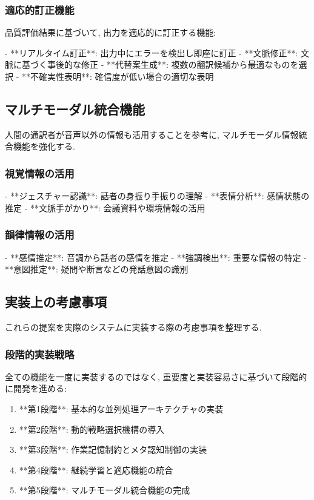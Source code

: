 \subsubsection{適応的訂正機能}

品質評価結果に基づいて, 出力を適応的に訂正する機能:

- **リアルタイム訂正**: 出力中にエラーを検出し即座に訂正
- **文脈修正**: 文脈に基づく事後的な修正
- **代替案生成**: 複数の翻訳候補から最適なものを選択
- **不確実性表明**: 確信度が低い場合の適切な表明

\subsection{マルチモーダル統合機能}

人間の通訳者が音声以外の情報も活用することを参考に, マルチモーダル情報統合機能を強化する.

\subsubsection{視覚情報の活用}

- **ジェスチャー認識**: 話者の身振り手振りの理解
- **表情分析**: 感情状態の推定
- **文脈手がかり**: 会議資料や環境情報の活用

\subsubsection{韻律情報の活用}

- **感情推定**: 音調から話者の感情を推定
- **強調検出**: 重要な情報の特定
- **意図推定**: 疑問や断言などの発話意図の識別

\subsection{実装上の考慮事項}

これらの提案を実際のシステムに実装する際の考慮事項を整理する.

\subsubsection{段階的実装戦略}

全ての機能を一度に実装するのではなく, 重要度と実装容易さに基づいて段階的に開発を進める:

\begin{enumerate}
\item **第1段階**: 基本的な並列処理アーキテクチャの実装
\item **第2段階**: 動的戦略選択機構の導入
\item **第3段階**: 作業記憶制約とメタ認知制御の実装
\item **第4段階**: 継続学習と適応機能の統合
\item **第5段階**: マルチモーダル統合機能の完成
\end{enumerate}

